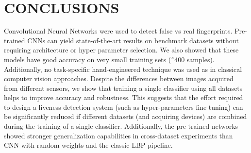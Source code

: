 \documentclass[a4paper,12pt,oneside]{article}
\begin{document}
\newpage
\section{CONCLUSIONS}
Convolutional Neural Networks were used to detect false vs real fingerprints. Pre-trained CNNs can yield state-of-the-art results on benchmark datasets without requiring architecture or hyper parameter selection. We also showed that these models have good accuracy on very small training sets (˜400 samples). Additionally, no task-specific hand-engineered technique was used as in classical computer vision approaches. Despite the differences between images acquired from different sensors, we show that training a single classifier using all datasets helps to improve accuracy and robustness. This suggests that the effort required to design a liveness detection system (such as hyper-parameters fine tuning) can be significantly reduced if different datasets (and acquiring devices) are combined during the training of a single classifier. Additionally, the pre-trained networks showed stronger generalization capabilities in cross-dataset experiments than CNN with random weights and the classic LBP pipeline.
\end{document}
